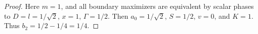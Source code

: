 \begin{proof}
Here $m=1$, and all boundary maximizers are equivalent by scalar phases
to $D=l=1/\sqrt2$, $x=1$, $\Gamma=1/2$.  Then
$a_0=1/\sqrt2$, $S=1/2$, $v=0$, and $K=1$.
Thus $b_2=1/2-1/4=1/4$.
\end{proof}
